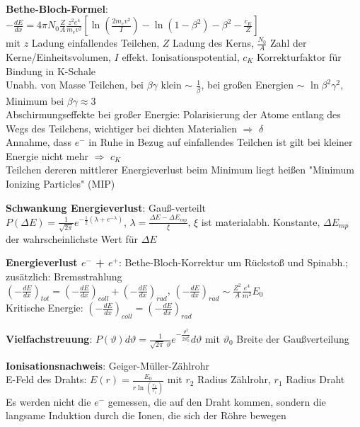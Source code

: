 \documentclass[10pt,twoside,a4paper]{article}
\begin{document}
\begin{multicols*}{3}
\ \\
\textbf{Bethe-Bloch-Formel}: \\
{\tiny $-\frac{dE}{dx} = 4 \pi N_0 \frac{Z}{A} \frac{z^2 e^4}{m_e v^2} \left[ \ln \left( \frac{2 m_e v^2}{I} \right) - \ln \left( 1 - \beta^2 \right) - \beta^2 - \frac{c_K}{Z} \right]$} \\
mit $z$ Ladung einfallendes Teilchen, $Z$ Ladung des Kerns, $\frac{N_0}{A}$ Zahl der Kerne/Einheitsvolumen, $I$ effekt. Ionisationspotential, $c_K$ Korrekturfaktor für Bindung in K-Schale \\
Unabh. von Masse Teilchen, bei $\beta \gamma$ klein $\sim$ $\frac{1}{\beta}$, bei großen Energien $\sim$ $\ln \beta^2 \gamma^2$, Minimum bei $\beta \gamma \approx 3$ \\
Abschirmungseffekte bei großer Energie: Polarisierung der Atome entlang des Wegs des Teilchens, wichtiger bei dichten Materialien $\Rightarrow$ $\delta$ \\
Annahme, dass $e^-$ in Ruhe in Bezug auf einfallendes Teilchen ist gilt bei kleiner Energie nicht mehr $\Rightarrow$ $c_K$ \\
Teilchen dereren mittlerer Energieverlust beim Minimum liegt heißen "Minimum Ionizing Particles" (MIP)

\textbf{Schwankung Energieverlust}: Gauß-verteilt \\
$P(\Delta E) = \frac{1}{\sqrt{2 \pi}} e^{-\frac{1}{2}\left( \lambda + e^{-\lambda} \right)}$, $\lambda = \frac{\Delta E - {\Delta E}_{mp}}{\xi}$, $\xi$ ist materialabh. Konstante, ${\Delta E}_{mp}$ der wahrscheinlichste Wert für $\Delta E$

\textbf{Energieverlust $e^-$ + $e^+$}: Bethe-Bloch-Korrektur um Rückstoß und Spinabh.; zusätzlich: Bremsstrahlung \\
$\left( - \frac{dE}{dx} \right)_{tot} = \left( - \frac{dE}{dx} \right)_{coll} + \left( - \frac{dE}{dx} \right)_{rad}$, $\left( - \frac{dE}{dx} \right)_{rad} \sim \frac{Z^2}{A} \frac{e^4}{m^2} E_0$ \\
Kritische Energie: $\left( - \frac{dE}{dx} \right)_{coll} = \left( - \frac{dE}{dx} \right)_{rad}$

\textbf{Vielfachstreuung}: $P(\vartheta) d\vartheta = \frac{1}{\sqrt{2 \pi} \; \vartheta} e^{-\frac{\vartheta^2}{2 \vartheta^2_0}} d\vartheta$ mit $\vartheta_0$ Breite der Gaußverteilung

\textbf{Ionisationsnachweis}: Geiger-Müller-Zählrohr \\
E-Feld des Drahts: $E(r) = \frac{E_0}{r \ln \left( \frac{r_2}{r_1} \right)}$ mit $r_2$ Radius Zählrohr, $r_1$ Radius Draht \\
Es werden nicht die $e^-$ gemessen, die auf den Draht kommen, sondern die langsame Induktion durch die Ionen, die sich der Röhre bewegen


\end{multicols*}
\end{document}
